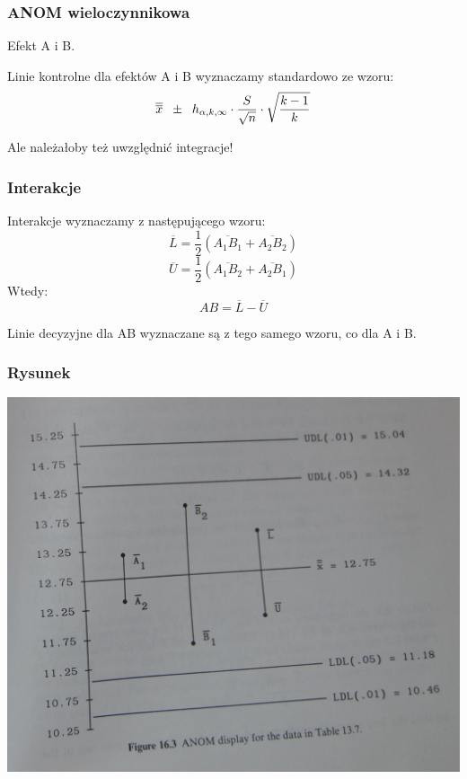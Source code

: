 \documentclass{beamer}
\begin{document}
\begin{frame}
\frametitle{ANOM wieloczynnikowa}
Efekt A i B. 

\bigskip

Linie kontrolne dla efektów A i B wyznaczamy standardowo ze wzoru:
$$
\overline{\overline{x}}\hspace{2mm}\pm\hspace{2mm}h_{\alpha,k,\infty}\cdot\dfrac{S}{\sqrt{n}}\cdot\sqrt{\dfrac{k-1}{k}}
$$

\bigskip

Ale należałoby też uwzględnić integracje!
\end{frame}

\begin{frame}
\frametitle{Interakcje}
Interakcje wyznaczamy z następującego wzoru:
$$
\overline{L}=\dfrac{1}{2}(\overline{A_1B_1}+\overline{A_2B_2})
$$
$$
\overline{U}=\dfrac{1}{2}(\overline{A_1B_2}+\overline{A_2B_1})
$$
Wtedy:
$$
AB = \overline{L} - \overline{U}
$$

\bigskip

Linie decyzyjne dla AB wyznaczane są z tego samego wzoru, co dla A i B.
\end{frame}

\begin{frame}
\frametitle{Rysunek}
\begin{center}
\includegraphics[scale=0.7]{in.jpg}
\end{center}
\end{frame}
\end{document}
